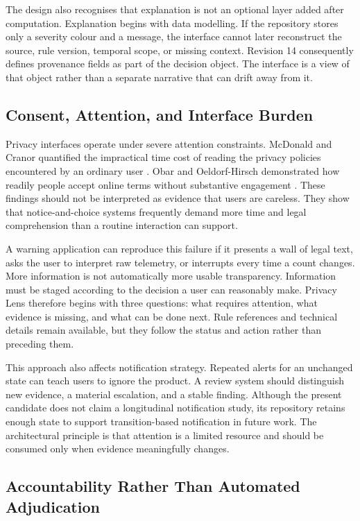 The design also recognises that explanation is not an optional layer added after computation. Explanation begins with data modelling. If the repository stores only a severity colour and a message, the interface cannot later reconstruct the source, rule version, temporal scope, or missing context. Revision 14 consequently defines provenance fields as part of the decision object. The interface is a view of that object rather than a separate narrative that can drift away from it.

\subsection{Consent, Attention, and Interface Burden}

Privacy interfaces operate under severe attention constraints. McDonald and Cranor quantified the impractical time cost of reading the privacy policies encountered by an ordinary user \cite{12}. Obar and Oeldorf-Hirsch demonstrated how readily people accept online terms without substantive engagement \cite{13}. These findings should not be interpreted as evidence that users are careless. They show that notice-and-choice systems frequently demand more time and legal comprehension than a routine interaction can support.

A warning application can reproduce this failure if it presents a wall of legal text, asks the user to interpret raw telemetry, or interrupts every time a count changes. More information is not automatically more usable transparency. Information must be staged according to the decision a user can reasonably make. Privacy Lens therefore begins with three questions: what requires attention, what evidence is missing, and what can be done next. Rule references and technical details remain available, but they follow the status and action rather than preceding them.

This approach also affects notification strategy. Repeated alerts for an unchanged state can teach users to ignore the product. A review system should distinguish new evidence, a material escalation, and a stable finding. Although the present candidate does not claim a longitudinal notification study, its repository retains enough state to support transition-based notification in future work. The architectural principle is that attention is a limited resource and should be consumed only when evidence meaningfully changes.

\subsection{Accountability Rather Than Automated Adjudication}

